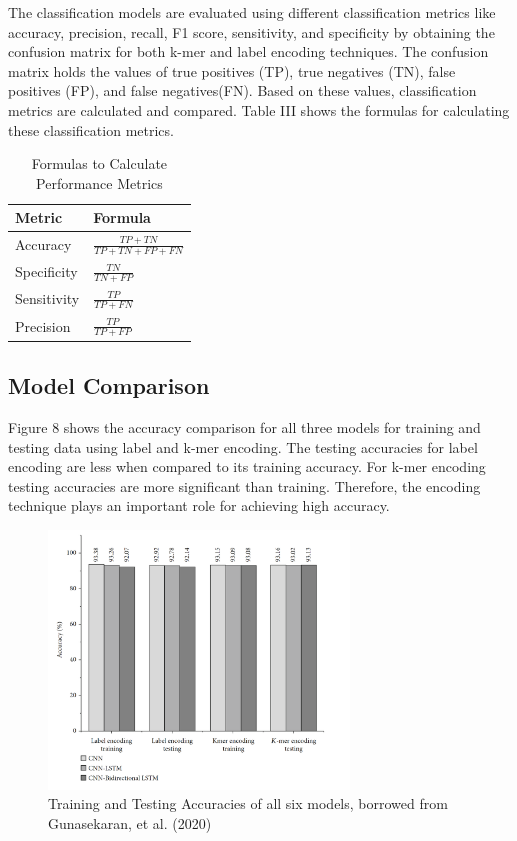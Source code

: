 \documentclass[journal]{IEEEtran}
\begin{document}
  The classification models are evaluated using different classification metrics like accuracy, precision, recall, F1 score, sensitivity, 
  and specificity by obtaining the confusion matrix for both k-mer and label encoding techniques.
  The confusion matrix holds the values of true positives (TP), true negatives (TN), false positives (FP), and false negatives(FN). 
  Based on these values, classification metrics are calculated and compared.
  Table III shows the formulas for calculating these classification metrics. 
  \begin{table}
    \caption{\label{tab:table3}Formulas to Calculate Performance Metrics}
    \centering
      \begin{tabular}{ || l l ||}
      \hline
      Metric & Formula \\ 
      \hline
      \hline
      Accuracy    & $\frac{TP + TN}{TP + TN + FP + FN}$\\  
      Specificity & $\frac{TN}{TN + FP}$ \\
      Sensitivity & $\frac{TP}{TP + FN}$ \\
      Precision   & $\frac{TP}{TP + FP}$ \\
      \hline
      \end{tabular}%
  \end{table}

  \subsection{Model Comparison}
    Figure 8 shows the accuracy comparison for all three models for training and testing data using label and k-mer encoding. 
    The testing accuracies for label encoding are less when compared to its training accuracy. 
    For k-mer encoding testing accuracies are more significant than training. 
    Therefore, the encoding technique plays an important role for achieving high accuracy.
  
    \begin{figure}
      \centering
      \includegraphics[width=8cm]{figures/accuracy.png}
      \caption{Training and Testing Accuracies of all six models, borrowed from Gunasekaran, et al. (2020)}
    \end{figure}
\end{document}
